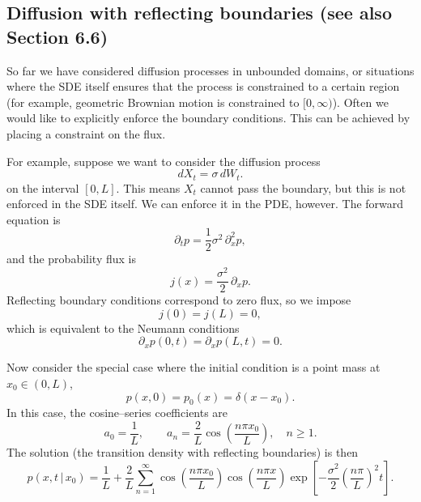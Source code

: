 \documentclass[11pt]{article}
\begin{document}
\subsection*{Diffusion with reflecting boundaries (see also Section 6.6)}

So far we have considered diffusion processes in unbounded domains, or situations where the SDE itself ensures that the process is constrained to a certain region (for example, geometric Brownian motion is constrained to $[0,\infty)$). Often we would like to explicitly enforce the boundary conditions. This can be achieved by placing a constraint on the flux.

For example, suppose we want to consider the diffusion process
\begin{equation}
dX_t = \sigma\, dW_t.
\end{equation}
on the interval $[0,L]$. This means $X_t$ cannot pass the boundary, but this is not enforced in the SDE itself. We can enforce it in the PDE, however. The forward equation is
\begin{equation}
\partial_t p = \frac{1}{2}\sigma^2\,\partial_x^2 p,
\end{equation}
and the probability flux is
\begin{equation}
j(x) = \frac{\sigma^2}{2}\,\partial_x p.
\end{equation}
Reflecting boundary conditions correspond to zero flux, so we impose
\begin{equation}
j(0)=j(L)=0,
\end{equation}
which is equivalent to the Neumann conditions
\begin{equation}
\partial_x p(0,t)=\partial_x p(L,t)=0.
\end{equation}

Now consider the special case where the initial condition is a point mass at $x_0\in(0,L)$,
\begin{equation}
p(x,0) = p_0(x) = \delta(x - x_0).
\end{equation}
In this case, the cosine–series coefficients are
\begin{equation}
a_0 = \frac{1}{L}, \qquad
a_n = \frac{2}{L}\cos\!\left(\frac{n\pi x_0}{L}\right), \quad n \ge 1.
\end{equation}
The solution (the transition density with reflecting boundaries) is then
\begin{equation}
p(x,t\,|\,x_0)
=
\frac{1}{L}
+
\frac{2}{L}
\sum_{n=1}^\infty
\cos\!\left(\frac{n\pi x_0}{L}\right)
\cos\!\left(\frac{n\pi x}{L}\right)
\exp\!\left[-\frac{\sigma^2}{2}\left(\frac{n\pi}{L}\right)^2 t\right].
\end{equation}
\end{document}
